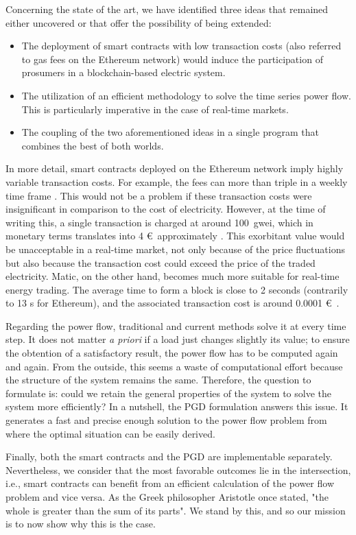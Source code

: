 Concerning the state of the art, we have identified three ideas that remained either uncovered or that offer the possibility of being extended:
\begin{itemize}
    \item The deployment of smart contracts with low transaction costs (also referred to gas fees on the Ethereum network) would induce the participation of prosumers in a blockchain-based electric system.
    \item The utilization of an efficient methodology to solve the time series power flow. This is particularly imperative in the case of real-time markets. 
    \item The coupling of the two aforementioned ideas in a single program that combines the best of both worlds.
\end{itemize}
In more detail, smart contracts deployed on the Ethereum network imply highly variable transaction costs. For example, the fees can more than triple in a weekly time frame \cite{eth_gas}. This would not be a problem if these transaction costs were insignificant in comparison to the cost of electricity. However, at the time of writing this, a single transaction is charged at around 100~gwei, which in monetary terms translates into 4 \euro \  approximately \cite{eth_price}. This exorbitant value would be unacceptable in a real-time market, not only because of the price fluctuations but also because the transaction cost could exceed the price of the traded electricity. Matic, on the other hand, becomes much more suitable for real-time energy trading. The average time to form a block is close to 2 seconds (contrarily to 13 s for Ethereum), and the associated transaction cost is around 0.0001 \euro \ \cite{eth_price2, matic_expl}.

Regarding the power flow, traditional and current methods solve it at every time step. It does not matter \textit{a priori} if a load just changes slightly its value; to ensure the obtention of a satisfactory result, the power flow has to be computed again and again. From the outside, this seems a waste of computational effort because the structure of the system remains the same. Therefore, the question to formulate is: could we retain the general properties of the system to solve the system more efficiently? In a nutshell, the PGD formulation answers this issue. It generates a fast and precise enough solution to the power flow problem from where the optimal situation can be easily derived. 

Finally, both the smart contracts and the PGD are implementable separately. Nevertheless, we consider that the most favorable outcomes lie in the intersection, i.e., smart contracts can benefit from an efficient calculation of the power flow problem and vice versa. As the Greek philosopher Aristotle once stated, "the whole is greater than the sum of its parts". We stand by this, and so our mission is to now show why this is the case.

